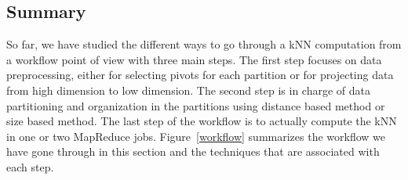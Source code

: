 \subsection{Summary}
So far, we have studied the different ways to go through a kNN computation from a workflow point of view with three main steps.
The first step focuses on data preprocessing, either for selecting pivots for each partition or for projecting data from high dimension to low dimension.
The second step is in charge of data partitioning and organization in the partitions using distance based method or size based method. The last step of the workflow is to actually compute the kNN in one or two MapReduce jobs. Figure~\ref{workflow} summarizes the 
workflow we have gone through in this section and the techniques that are associated with each step.

